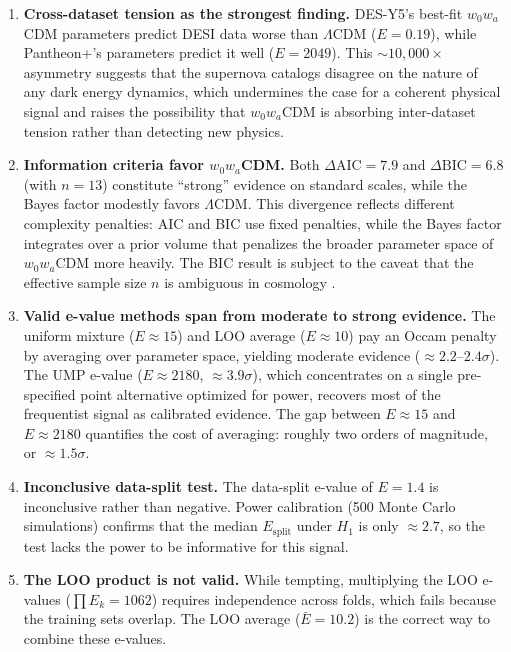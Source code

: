 \documentclass[11pt,a4paper]{article}
\newcommand{\LCDM}{$\Lambda$CDM}
\begin{document}
\begin{enumerate}
    \item \textbf{Cross-dataset tension as the strongest finding.} DES-Y5's best-fit $w_0w_a$CDM parameters predict DESI data worse than \LCDM{} ($E = 0.19$), while Pantheon+'s parameters predict it well ($E = 2049$). This ${\sim}10{,}000\times$ asymmetry suggests that the supernova catalogs disagree on the nature of any dark energy dynamics, which undermines the case for a coherent physical signal and raises the possibility that $w_0w_a$CDM is absorbing inter-dataset tension rather than detecting new physics.

    \item \textbf{Information criteria favor $w_0w_a$CDM.} Both $\Delta\text{AIC} = 7.9$ and $\Delta\text{BIC} = 6.8$ (with $n = 13$) constitute ``strong'' evidence on standard scales, while the Bayes factor modestly favors \LCDM{}. This divergence reflects different complexity penalties: AIC and BIC use fixed penalties, while the Bayes factor integrates over a prior volume that penalizes the broader parameter space of $w_0w_a$CDM more heavily. The BIC result is subject to the caveat that the effective sample size $n$ is ambiguous in cosmology \citep{Liddle2007}.

    \item \textbf{Valid e-value methods span from moderate to strong evidence.} The uniform mixture ($E \approx 15$) and LOO average ($E \approx 10$) pay an Occam penalty by averaging over parameter space, yielding moderate evidence ($\approx 2.2$--$2.4\sigma$). The UMP e-value ($E \approx 2180$, $\approx 3.9\sigma$), which concentrates on a single pre-specified point alternative optimized for power, recovers most of the frequentist signal as calibrated evidence. The gap between $E \approx 15$ and $E \approx 2180$ quantifies the cost of averaging: roughly two orders of magnitude, or $\approx 1.5\sigma$.

    \item \textbf{Inconclusive data-split test.} The data-split e-value of $E = 1.4$ is inconclusive rather than negative. Power calibration (500 Monte Carlo simulations) confirms that the median $E_{\text{split}}$ under $H_1$ is only $\approx 2.7$, so the test lacks the power to be informative for this signal.

    \item \textbf{The LOO product is not valid.} While tempting, multiplying the LOO e-values ($\prod E_k = 1062$) requires independence across folds, which fails because the training sets overlap. The LOO average ($\bar{E} = 10.2$) is the correct way to combine these e-values.
\end{enumerate}
\end{document}
